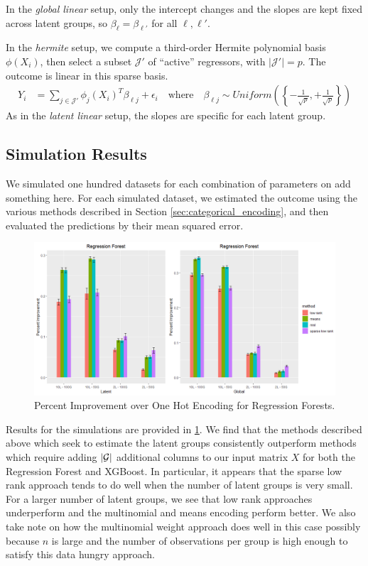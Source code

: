 \documentclass{article}
\theoremstyle{plain}
\theoremstyle{definition}
\theoremstyle{remark}
\begin{document}
In the \emph{global linear} setup, only the intercept changes and the slopes are kept fixed across latent groups, so $\beta_{\ell} = \beta_{\ell'}$ for all $\ell, \ell'$.

In the  \emph{hermite} setup, we compute a third-order Hermite polynomial basis $\phi(X_{i})$, then select a subset $\mathcal{J}'$ of ``active'' regressors, with $|\mathcal{J}'| = p$. The outcome is linear in this sparse basis.
\begin{align}
  Y_{i} &= \sum_{j \in \mathcal{J'}} \phi_{j}(X_{i})^{T}\beta_{\ell j} + \epsilon_{i}
  \quad \text{where} \quad
  \beta_{\ell j} \sim Uniform\left(\left\{-\frac{1}{\sqrt{p}}, +\frac{1}{\sqrt{p}}\right\}\right) \label{eq:hermite_outcome}
\end{align}
As in the \emph{latent linear} setup, the slopes are specific for each latent group.



\subsection{Simulation Results}
\label{sec:simulation_results}

We simulated one hundred datasets for each combination of parameters on {\color{red} add something here}. For each simulated dataset, we estimated the outcome using the various methods described in Section \ref{sec:categorical_encoding}, and then evaluated the predictions by their mean squared error.


\begin{figure}[htbp]
	\centering
	\includegraphics[width=\linewidth]{figures/rf_sims_output.png}
	\caption {Percent Improvement over One Hot Encoding for Regression Forests.}
	\label{tab:rf_sim_setups}
\end{figure}

Results for the simulations are provided in \ref{tab:rf_sim_setups}. We find that the methods described above which seek to estimate the latent groups consistently outperform methods which require adding $|\mathcal{G}|$ additional columns to our input matrix $X$ for both the Regression Forest and XGBoost. In particular, it appears that the sparse low rank approach tends to do well when the number of latent groups is very small. For a larger number of latent groups, we see that low rank approaches underperform and the multinomial and means encoding perform better. We also take note on how the multinomial weight approach does well in this case possibly because $n$ is large and the number of observations per group is high enough to satisfy this data hungry approach. 
\end{document}

